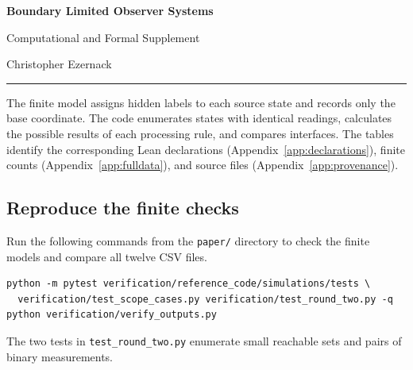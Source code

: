 \documentclass[11pt]{article}
\begin{document}
\begin{flushleft}
{\LARGE\bfseries Boundary Limited Observer Systems}\par
\vspace{0.25em}
{\large Computational and Formal Supplement}\par
\vspace{0.5em}
{\normalsize Christopher Ezernack}\par
\end{flushleft}
\vspace{0.5em}
\hrule
\vspace{0.8em}

The finite model assigns hidden labels to each source state and records only the base coordinate. The code enumerates states with identical readings, calculates the possible results of each processing rule, and compares interfaces. The tables identify the corresponding Lean declarations (Appendix~\ref{app:declarations}), finite counts (Appendix~\ref{app:fulldata}), and source files (Appendix~\ref{app:provenance}).


\appendix




\subsection{Reproduce the finite checks}
Run the following commands from the \nolinkurl{paper/} directory to check the finite models and compare all twelve CSV files.
\begin{lstlisting}[language={}]
python -m pytest verification/reference_code/simulations/tests \
  verification/test_scope_cases.py verification/test_round_two.py -q
python verification/verify_outputs.py
\end{lstlisting}
The two tests in \nolinkurl{test_round_two.py} enumerate small reachable sets and pairs of binary measurements.
\end{document}
